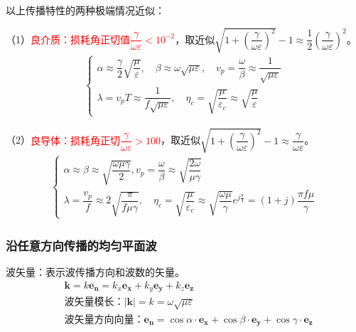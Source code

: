 \documentclass[withoutpreface,bwprint]{cumcmthesis} %
\begin{document}
以上传播特性的两种极端情况近似：

（1）\textcolor{red}{良介质：损耗角正切值$\dfrac{\gamma}{\omega \varepsilon}<10^{-2}$}，取近似$\sqrt{1 + \left( \dfrac{\gamma}{\omega\varepsilon} \right)^2} - 1 \approx \dfrac{1}{2}\left( \dfrac{\gamma}{\omega\varepsilon} \right)^2$。
\begin{align}
    \begin{cases}
        \alpha \approx \dfrac{\gamma}{2}\sqrt{\dfrac{\mu}{\varepsilon}} ,\quad \beta \approx \omega \sqrt{\mu \varepsilon}, \quad v_p =   \dfrac{\omega}{\beta} \approx \dfrac{1}{\sqrt{\mu \varepsilon}}\\
        \lambda = v_p T \approx \dfrac{1}{f\sqrt{\mu \varepsilon}}, \quad \eta_c = \sqrt{\dfrac{\mu}{\varepsilon_c}} \approx \sqrt{\dfrac{\mu}{\varepsilon}}
    \end{cases}
\end{align}

（2）\textcolor{red}{良导体：损耗角正切$\dfrac{\gamma}{\omega \varepsilon}>100$}，取近似$\sqrt{1 + \left( \dfrac{\gamma}{\omega\varepsilon} \right)^2} - 1 \approx \dfrac{\gamma}{\omega\varepsilon}$。
\begin{align} 
    \begin{cases}
        \alpha \approx \beta \approx \sqrt{\dfrac{\omega \mu \gamma}{2}}, v_p = \dfrac{\omega}{\beta} \approx \sqrt{\dfrac{2\omega}{\mu\gamma}}\\
        \lambda = \dfrac{v_p}{f} \approx 2\sqrt{\dfrac{\pi}{f\mu\gamma}}, \quad \eta_c = \sqrt{\dfrac{\mu}{\varepsilon_c}} \approx \sqrt{\dfrac{\omega\mu}{\gamma}}e^{j\frac{\pi}{4}}=(1+j)\dfrac{\pi f \mu}{\gamma}
    \end{cases}
\end{align}

\subsubsection{沿任意方向传播的均匀平面波}
波矢量：表示波传播方向和波数的矢量。
\begin{align}
    &\boldsymbol{k} = k\boldsymbol{e_n} = k_x\boldsymbol{e_x}+k_y\boldsymbol{e_y}+k_z\boldsymbol{e_z}\\
    &\mbox{波矢量模长：}|\boldsymbol{k}| = k = \omega \sqrt{\mu \varepsilon}\\
    &\mbox{波矢量方向向量：}\boldsymbol{e_n}=\cos\alpha\cdot \boldsymbol{e_x}+\cos\beta\cdot \boldsymbol{e_y}+\cos\gamma\cdot \boldsymbol{e_z}
\end{align}
\end{document}

